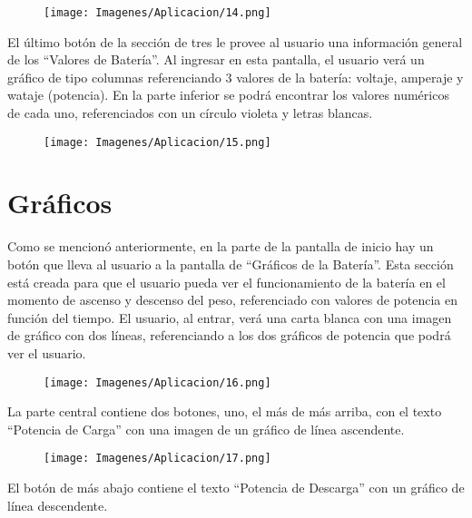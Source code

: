         \begin{figure} [H]
            \centering
            \texttt{[image: Imagenes/Aplicacion/14.png]}
        \end{figure}

        El último botón de la sección de tres le provee al usuario una información general de los “Valores de Batería”. Al ingresar en esta pantalla, el usuario verá un gráfico de tipo columnas referenciando 3 valores de la batería: voltaje, amperaje y wataje (potencia). En la parte inferior se podrá encontrar los valores numéricos de cada uno, referenciados con un círculo violeta y letras blancas.\par

        \begin{figure} [H]
            \centering
            \texttt{[image: Imagenes/Aplicacion/15.png]}
        \end{figure}

    \section{Gráficos}
        Como se mencionó anteriormente, en la parte de la pantalla de inicio hay un botón que lleva al usuario a la pantalla de “Gráficos de la Batería”. Esta sección está creada para que el usuario pueda ver el funcionamiento de la batería en el momento de ascenso y descenso del peso, referenciado con valores de potencia en función del tiempo. El usuario, al entrar, verá una carta blanca con una imagen de gráfico con dos líneas, referenciando a los dos gráficos de potencia que podrá ver el usuario.\par

        \begin{figure} [H]
            \centering
            \texttt{[image: Imagenes/Aplicacion/16.png]}
        \end{figure}
        
        La parte central contiene dos botones, uno, el más de más arriba, con el texto “Potencia de Carga” con una imagen de un gráfico de línea ascendente.\par

        \begin{figure} [H]
            \centering
            \texttt{[image: Imagenes/Aplicacion/17.png]}
        \end{figure}

        El botón de más abajo contiene el texto “Potencia de Descarga” con un gráfico de línea descendente.\par

